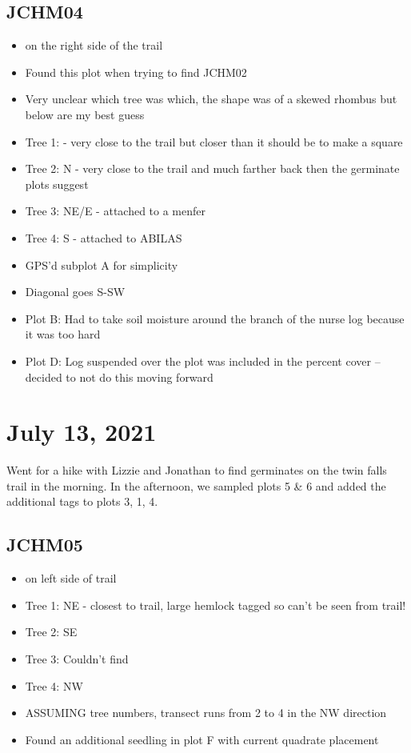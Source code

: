 \documentclass{article}\usepackage[]{graphicx}\usepackage[]{color}
\begin{document}
\subsection{JCHM04}
\begin{itemize}
\item on the right side of the trail
\item Found this plot when trying to find JCHM02
\item Very unclear which tree was which, the shape was of a skewed rhombus but below are my best guess
\item Tree 1:  - very close to the trail but closer than it should be to make a square
\item Tree 2: N - very close to the trail and much farther back then the germinate plots suggest
\item Tree 3: NE/E - attached to a menfer
\item Tree 4: S - attached to ABILAS
\item GPS'd subplot A for simplicity
\item Diagonal goes S-SW
\item Plot B: Had to take soil moisture around the branch of the nurse log because it was too hard
\item Plot D: Log suspended over the plot was included in the percent cover -- decided to not do this moving forward
\end{itemize}

\section{July 13, 2021}
Went for a hike with Lizzie and Jonathan to find germinates on the twin falls trail in the morning. In the afternoon, we sampled plots 5 \& 6 and added the additional tags to plots 3, 1, 4. 
 
\subsection{JCHM05}
\begin{itemize}
\item on left side of trail
\item Tree 1: NE - closest to trail, large hemlock tagged so can't be seen from trail!
\item Tree 2: SE
\item Tree 3: Couldn't find
\item Tree 4: NW
\item ASSUMING tree numbers, transect runs from 2 to 4 in the NW direction
\item Found an additional seedling in plot F with current quadrate placement 
\end{itemize}
\end{document}
